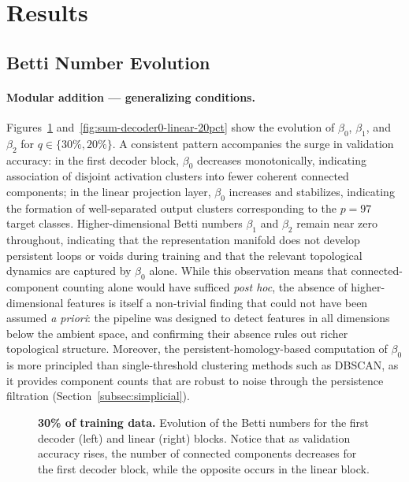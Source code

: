 \section{Results}
\label{sec:results}

\subsection{Betti Number Evolution}
\label{subsec:results_betti}

\paragraph{Modular addition — generalizing conditions.}
Figures~\ref{fig:sum-decoder0-linear-30pct} and~\ref{fig:sum-decoder0-linear-20pct} show the evolution of $\beta_0$, $\beta_1$, and $\beta_2$ for $q \in \{30\%, 20\%\}$. A consistent pattern accompanies the surge in validation accuracy: in the first decoder block, $\beta_0$ decreases monotonically, indicating association of disjoint activation clusters into fewer coherent connected components; in the linear projection layer, $\beta_0$ increases and stabilizes, indicating the formation of well-separated output clusters corresponding to the $p = 97$ target classes. Higher-dimensional Betti numbers $\beta_1$ and $\beta_2$ remain near zero throughout, indicating that the representation manifold does not develop persistent loops or voids during training and that the relevant topological dynamics are captured by $\beta_0$ alone. While this observation means that connected-component counting alone would have sufficed \emph{post hoc}, the absence of higher-dimensional features is itself a non-trivial finding that could not have been assumed \emph{a priori}: the pipeline was designed to detect features in all dimensions below the ambient space, and confirming their absence rules out richer topological structure. Moreover, the persistent-homology-based computation of $\beta_0$ is more principled than single-threshold clustering methods such as DBSCAN, as it provides component counts that are robust to noise through the persistence filtration (Section~\ref{subsec:simplicial}).

\begin{figure}[htbp]
    \centering
    \hfill
    
    \caption[30\% of training data.]{\textbf{30\% of training data.} Evolution of the Betti numbers for the first decoder (left) and linear (right) blocks. Notice that as validation accuracy rises, the number of connected components decreases for the first decoder block, while the opposite occurs in the linear block.}
    \label{fig:sum-decoder0-linear-30pct}
\end{figure}

